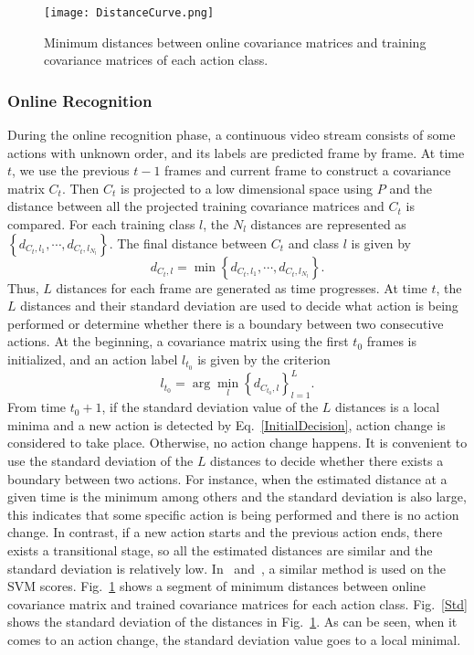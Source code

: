 \documentclass[sigconf]{acmart}
\begin{document}
\begin{figure}
  \centering
  \texttt{[image: DistanceCurve.png]}\\
  \caption{Minimum distances between online covariance matrices and training covariance matrices of each action class.}\label{DistanceCurve}
\end{figure}

\subsubsection{Online Recognition}
During the online recognition phase, a continuous video stream consists of some actions with unknown order, and its labels are predicted frame by frame. At time $t$, we use the previous $t-1$ frames and current frame to construct a covariance matrix $C_t$. Then $C_t$ is projected to a low dimensional space using $P$ and  the distance between all the projected training covariance matrices and $C_t$ is compared. For each training class $l$, the $N_l$ distances are represented as $\left\{ {{d_{{C_t},{l_1}}}, \cdots ,{d_{{C_t},{l_{N_l}}}}} \right\}$. The final distance between $C_t$ and class $l$ is given by
\begin{equation}\label{MinDistance}
{d_{{C_t},l}} = \min \left\{ {{d_{{C_t},{l_1}}}, \cdots ,{d_{{C_t},{l_{N_l}}}}} \right\}.
\end{equation}
Thus, $L$ distances for each frame are generated as time progresses. At time $t$, the $L$ distances and their standard deviation are used to decide what action is being performed or determine whether there is a boundary between two consecutive actions. At the beginning, a covariance matrix using the first $t_0$ frames is initialized, and  an action label $l_{t_0}$ is given by the criterion
\begin{equation}\label{InitialDecision}
{l_{t_0}} = \arg \mathop {\min }\limits_l \left\{ {{d_{{C_{t_0}},l}}} \right\}_{l = 1}^L.
\end{equation}
From time $t_0+1$, if the standard deviation value of the $L$ distances is a local minima and a new action is detected by Eq.~\ref{InitialDecision}, action change is considered to take place. Otherwise, no action change happens. It is convenient to use the standard deviation of the $L$ distances to decide whether there exists a boundary between two actions. For instance, when the estimated distance at a given time is the minimum among others and the standard deviation is also large, this indicates that some specific action is being performed and there is no action change. In contrast, if a new action starts and the previous action ends, there exists a transitional stage, so all the estimated distances are similar and the standard deviation is relatively low. In~\cite{fanello2013keep} and~\cite{DeRosa2014}, a similar method is used on the SVM scores. Fig.~\ref{DistanceCurve} shows a segment of minimum distances between online covariance matrix and trained covariance matrices for each action class. Fig.~\ref{Std} shows the standard deviation of the distances in Fig.~\ref{DistanceCurve}. As can be seen, when it comes to an action change, the standard deviation value goes to a local minimal.
\end{document}
